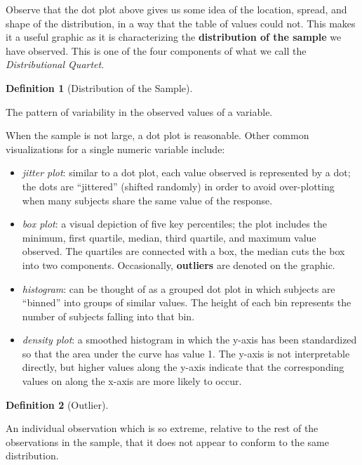 \documentclass[
  letterpaper,
  DIV=11,
  numbers=noendperiod]{scrreprt}
\providecommand{\tightlist}{%
  \setlength{\itemsep}{0pt}\setlength{\parskip}{0pt}}\usepackage{longtable,booktabs,array}
\theoremstyle{definition}
\newtheorem{definition}{Definition}[chapter]
\theoremstyle{definition}
\theoremstyle{plain}
\theoremstyle{remark}
\begin{document}
Observe that the dot plot above gives us some idea of the location,
spread, and shape of the distribution, in a way that the table of values
could not. This makes it a useful graphic as it is characterizing the
\textbf{distribution of the sample} we have observed. This is one of the
four components of what we call the \emph{Distributional Quartet}.

\begin{definition}[Distribution of the
Sample]\protect\hypertarget{def-distribution-sample}{}\label{def-distribution-sample}

The pattern of variability in the observed values of a variable.

\end{definition}

When the sample is not large, a dot plot is reasonable. Other common
visualizations for a single numeric variable include:

\begin{itemize}
\tightlist
\item
  \emph{jitter plot}: similar to a dot plot, each value observed is
  represented by a dot; the dots are ``jittered'' (shifted randomly) in
  order to avoid over-plotting when many subjects share the same value
  of the response.
\item
  \emph{box plot}: a visual depiction of five key percentiles; the plot
  includes the minimum, first quartile, median, third quartile, and
  maximum value observed. The quartiles are connected with a box, the
  median cuts the box into two components. Occasionally,
  \textbf{outliers} are denoted on the graphic.
\item
  \emph{histogram}: can be thought of as a grouped dot plot in which
  subjects are ``binned'' into groups of similar values. The height of
  each bin represents the number of subjects falling into that bin.
\item
  \emph{density plot}: a smoothed histogram in which the y-axis has been
  standardized so that the area under the curve has value 1. The y-axis
  is not interpretable directly, but higher values along the y-axis
  indicate that the corresponding values on along the x-axis are more
  likely to occur.
\end{itemize}

\begin{definition}[Outlier]\protect\hypertarget{def-outlier}{}\label{def-outlier}

An individual observation which is so extreme, relative to the rest of
the observations in the sample, that it does not appear to conform to
the same distribution.

\end{definition}
\end{document}
